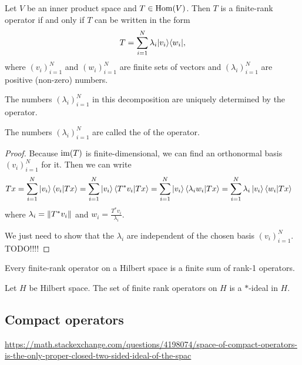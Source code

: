 \begin{proposition} \label{finiteRankSingularValues}
Let $V$ be an inner product space and $T\in\operatorname{Hom}(V)$. Then $T$ is a finite-rank operator \textup{if and only if} $T$ can be written in the form
\[ T = \sum_{i=1}^N \lambda_i |v_i\rangle\langle w_i|, \]
where $(v_i)_{i=1}^N$ and $(w_i)_{i=1}^N$ are finite sets of vectors and $(\lambda_i)_{i=1}^N$ are positive (non-zero) numbers.

The numbers $(\lambda_i)_{i=1}^N$ in this decomposition are uniquely determined by the operator.
\end{proposition}
The numbers $(\lambda_i)_{i=1}^N$ are called the  of the operator.
\begin{proof}
Because $\operatorname{im}(T)$ is finite-dimensional, we can find an orthonormal basis $(v_i)_{i=1}^N$ for it. Then we can write
\begin{align*}
Tx &= \sum_{i=1}^N \ket{v_i}\braket{v_i}{Tx} = \sum_{i=1}^N \ket{v_i}\braket{T^*v_i}{Tx} = \sum_{i=1}^N \ket{v_i}\braket{\lambda_i w_i}{Tx}  = \sum_{i=1}^N \lambda_i\ket{v_i}\braket{w_i}{Tx}
\end{align*}
where $\lambda_i = \lVert T^*v_i\rVert$ and $w_i = \frac{T^*v_i}{\lambda_i}$.

We just need to show that the $\lambda_i$ are independent of the chosen basis $(v_i)_{i=1}^N$. TODO!!!!
\end{proof}
\begin{corollary}
Every finite-rank operator on a Hilbert space is a finite sum of rank-1 operators.
\end{corollary}

\begin{lemma}
Let $H$ be Hilbert space. The set of finite rank operators on $H$ is a $*$-ideal in $H$.
\end{lemma}

\subsection{Compact operators}

\url{https://math.stackexchange.com/questions/4198074/space-of-compact-operators-is-the-only-proper-closed-two-sided-ideal-of-the-spac}

